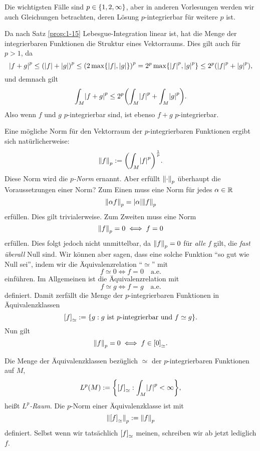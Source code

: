 Die wichtigsten Fälle sind \(p \in \braces*{1, 2, \infty}\), aber in anderen Vorlesungen werden wir auch Gleichungen betrachten, deren Lösung \(p\)-integrierbar für weitere \(p\) ist.

Da nach Satz \ref{prop:1-15} Lebesgue-Integration linear ist, hat die Menge der integrierbaren Funktionen die Struktur eines Vektorraums.
Dies gilt auch für \(p > 1\), da
\[
	\absolute*{f + g}^p \le \parentheses*{\absolute*{f} + \absolute*{g}}^p \le \parentheses*{2\max\braces*{\absolute*{f}, \absolute*{g}}}^p = 2^p \max\braces*{\absolute*{f}^p, \absolute*{g}^p} \le 2^p \parentheses*{\absolute*{f}^p + \absolute*{g}^p},
\]
und demnach gilt
\[
	\int_M \absolute*{f + g}^p \le 2^p \parentheses*{\int_M \absolute*{f}^p + \int_M \absolute*{g}^p}.
\]
Also wenn \(f\) und \(g\) \(p\)-integrierbar sind, ist ebenso \(f + g\) \(p\)-integrierbar.

Eine mögliche Norm für den Vektorraum der \(p\)-integrierbaren Funktionen ergibt sich natürlicherweise:
\[
	\norm*{f}_p := \parentheses*{\int_M \absolute*{f}^p}^{\frac{1}{p}}.
\]
Diese Norm wird die \emph{\(p\)-Norm} ernannt.
Aber erfüllt \(\norm*{\cdot}_p\) überhaupt die Voraussetzungen einer Norm?
Zum Einen muss eine Norm für jedes \(\alpha \in \R\)
\[
	\norm*{\alpha f}_p = \absolute*{\alpha}\norm*{f}_p
\]
erfüllen.
Dies gilt trivialerweise.
Zum Zweiten muss eine Norm
\[
	\norm*{f}_p = 0 \iff f = 0
\]
erfüllen.
Dies folgt jedoch nicht unmittelbar, da \(\norm*{f}_p = 0\) für \emph{alle} \(f\) gilt, die \emph{fast überall} Null sind.
Wir können aber sagen, dass eine solche Funktion ``so gut wie Null sei'', indem wir die Äquivalenzrelation ``\(\simeq\)'' mit
\[
	f \simeq 0 \iff f = 0 \quad \text{a.e.}
\]
einführen.
Im Allgemeinen ist die Äquivalenzrelation mit
\[
	f \simeq g \iff f = g \quad \text{a.e.}
\]
definiert.
Damit zerfällt die Menge der \(p\)-integrierbaren Funktionen in Äquivalenzklassen
\[
	\brackets*{f}_\simeq := \braces*{g : g\text{ ist }p\text{-integrierbar und }f \simeq g}.
\]
Nun gilt
\[
	\norm*{f}_p = 0 \iff f \in \brackets*{0}_\simeq.
\]

\begin{definition}[\(L^p\)-Raum]
	Die Menge der Äquivalenzklassen bezüglich \(\simeq\) der \(p\)-integrierbaren Funktionen auf \(M\),
	\[
		L^p\parentheses*{M} := \braces*{\brackets*{f}_\simeq : \int_M \absolute*{f}^p < \infty},
	\]
	heißt \emph{\(L^p\)-Raum}.
	Die \(p\)-Norm einer Äquivalenzklasse ist mit
	\begin{equation}\label{eq:1-31}
		\norm*{\brackets*{f}_\simeq}_p := \norm*{f}_p
	\end{equation}
	definiert.
	Selbst wenn wir tatsächlich \(\brackets*{f}_\simeq\) meinen, schreiben wir ab jetzt lediglich \(f\).
\end{definition}

